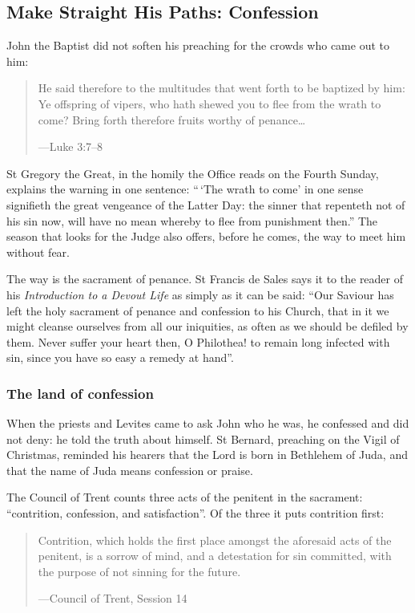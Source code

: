 \subsection{Make Straight His Paths: Confession}\label{sec:confession}

John the Baptist did not soften his preaching for the crowds who came out to
him:

\begin{quote}
He said therefore to the multitudes that went forth to be baptized by him: Ye
offspring of vipers, who hath shewed you to flee from the wrath to come? Bring
forth therefore fruits worthy of penance\dots\par
{\smallskip\noindent\small ---Luke 3:7--8\par}
\end{quote}

St Gregory the Great, in the homily the Office reads on the Fourth Sunday,
explains the warning in one sentence: ``\,`The wrath to come' in one sense
signifieth the great vengeance of the Latter Day: the sinner that repenteth not
of his sin now, will have no mean whereby to flee from punishment then.'' The
season that looks for the Judge also offers, before he comes, the way to meet
him without fear.

The way is the sacrament of penance. St Francis de Sales says it to the reader
of his \textit{Introduction to a Devout Life} as simply as it can be said:
``Our Saviour has left the holy sacrament of penance and confession to his
Church, that in it we might cleanse ourselves from all our iniquities, as often
as we should be defiled by them. Never suffer your heart then, O Philothea! to
remain long infected with sin, since you have so easy a remedy at hand''.

\subsubsection*{The land of confession}

When the priests and Levites came to ask John who he was, he confessed and did
not deny: he told the truth about himself. St Bernard, preaching on the Vigil
of Christmas, reminded his hearers that the Lord is born in Bethlehem of Juda,
and that the name of Juda means confession or praise.

The Council of Trent counts three acts of the penitent in the sacrament:
``contrition, confession, and satisfaction''. Of the three it puts contrition
first:

\begin{quote}
Contrition, which holds the first place amongst the aforesaid acts of the
penitent, is a sorrow of mind, and a detestation for sin committed, with the
purpose of not sinning for the future.\par
{\smallskip\noindent\small ---Council of Trent, Session 14\par}
\end{quote}

